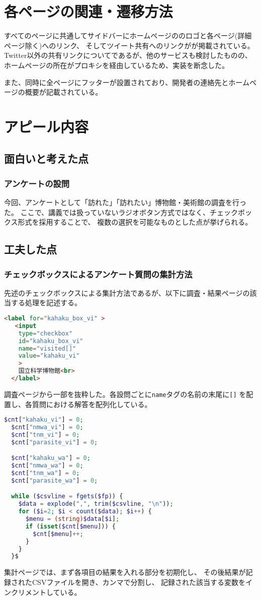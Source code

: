 \documentclass[11pt,a4paper, uplatex]{jsarticle}
\begin{document}
\section{各ページの関連・遷移方法}
すべてのページに共通してサイドバーにホームページののロゴと各ページ(詳細ページ除く)へのリンク、
そしてツイート共有へのリンクがが掲載されている。
Twitter以外の共有リンクについてであるが、他のサービスも検討したものの、
ホームページの所在がプロキシを経由しているため、実装を断念した。

また、同時に全ページにフッターが設置されており、開発者の連絡先とホームページの概要が記載されている。

\section{アピール内容}
\subsection{面白いと考えた点}
\subsubsection{アンケートの設問}
今回、アンケートとして「訪れた」「訪れたい」博物館・美術館の調査を行った。
ここで、講義では扱っていないラジオボタン方式ではなく、チェックボックス形式を採用することで、
複数の選択を可能なものとした点が挙げられる。


\subsection{工夫した点}
\subsubsection{チェックボックスによるアンケート質問の集計方法}
先述のチェックボックスによる集計方法であるが、以下に調査・結果ページの該当する処理を記述する。
\begin{lstlisting}[caption=enquete.html: 調査ページ一部,label=enquete,language=html]
  <label for="kahaku_box_vi" >
   <input
    type="checkbox"
    id="kahaku_box_vi"
    name="visited[]"
    value="kahaku_vi"
    >
    国立科学博物館<br>
  </label>
\end{lstlisting}

調査ページから一部を抜粋した。各設問ごとに\texttt{name}タグの名前の末尾に\texttt{[]}
を配置し、各質問における解答を配列化している。

\begin{lstlisting}[caption=enq_result.php: 結果表示ページ,label=result,language=php]
  $cnt["kahaku_vi"] = 0;
  $cnt["nmwa_vi"] = 0;
  $cnt["tnm_vi"] = 0;
  $cnt["parasite_vi"] = 0;

  $cnt["kahaku_wa"] = 0;
  $cnt["nmwa_wa"] = 0;
  $cnt["tnm_wa"] = 0;
  $cnt["parasite_wa"] = 0;

  while ($csvline = fgets($fp)) {
    $data = explode(",", trim($csvline, "\n"));
    for ($i=2; $i < count($data); $i++) {
      $menu = (string)$data[$i];
      if (isset($cnt[$menu])) {
        $cnt[$menu]++;
      }
    }
  }$
\end{lstlisting}

集計ページでは、まず各項目の結果を入れる部分を初期化し、
その後結果が記録されたCSVファイルを開き、カンマで分割し、
記録された該当する変数をインクリメントしている。
\end{document}
